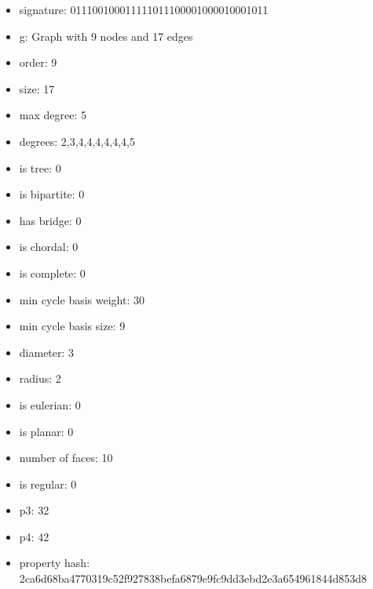 \newpage
\begin{figure}
\end{figure}
\begin{itemize}
\item signature: 011100100011111011100001000010001011
\item g: Graph with 9 nodes and 17 edges
\item order: 9
\item size: 17
\item max degree: 5
\item degrees: 2,3,4,4,4,4,4,4,5
\item is tree: 0
\item is bipartite: 0
\item has bridge: 0
\item is chordal: 0
\item is complete: 0
\item min cycle basis weight: 30
\item min cycle basis size: 9
\item diameter: 3
\item radius: 2
\item is eulerian: 0
\item is planar: 0
\item number of faces: 10
\item is regular: 0
\item p3: 32
\item p4: 42
\item property hash: 2ca6d68ba4770319c52f927838befa6879e9fc9dd3ebd2e3a654961844d853d8
\end{itemize}
